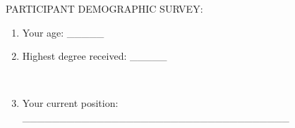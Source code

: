 \documentclass[12pt, a4paper, oneside]{article}
\providecommand{\tightlist}{%
  \setlength{\itemsep}{0pt}\setlength{\parskip}{0pt}}
\begin{document}
%
%
%
%
%
%
%
%
%
%
%
%
%
%
%
%
%
%
%
%
%
%
%
%
%
%
%
%
%
%
%
%
%

{PARTICIPANT DEMOGRAPHIC SURVEY:}

{}

\begin{enumerate}
\tightlist
\item
  {Your age: \_\_\_\_\_}
\end{enumerate}

{}

\begin{enumerate}
\setcounter{enumi}{1}
\tightlist
\item
  {Highest degree received: \_\_\_\_\_}
\end{enumerate}

{~~~~~~~~~}

\begin{enumerate}
\setcounter{enumi}{2}
\tightlist
\item
  {Your current position:
  \_\_\_\_\_\_\_\_\_\_\_\_\_\_\_\_\_\_\_\_\_\_\_\_\_\_\_\_\_\_\_\_\_\_\_\_}
\end{enumerate}
\end{document}
